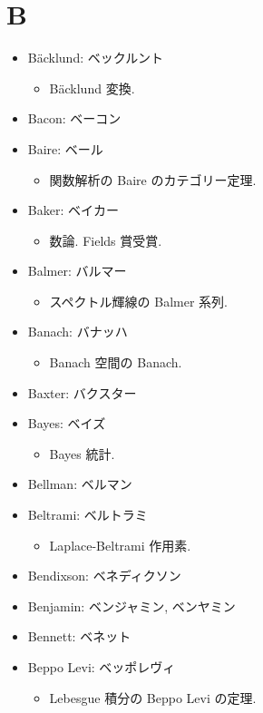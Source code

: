 \documentclass[openany, a4paper, oneside]{jsbook}
\begin{document}
\section{B}

\begin{itemize}
\item B\"acklund: ベックルント
\begin{itemize}
\item B\"acklund 変換.
\end{itemize}
\item Bacon: ベーコン
\item Baire: ベール
\begin{itemize}
\item 関数解析の Baire のカテゴリー定理.
\end{itemize}
\item Baker: ベイカー
\begin{itemize}
\item 数論. Fields 賞受賞.
\end{itemize}
\item Balmer: バルマー
\begin{itemize}
\item スペクトル輝線の Balmer 系列.
\end{itemize}
\item Banach: バナッハ
\begin{itemize}
\item Banach 空間の Banach.
\end{itemize}
\item Baxter: バクスター
\item Bayes: ベイズ
\begin{itemize}
\item Bayes 統計.
\end{itemize}
\item Bellman: ベルマン
\item Beltrami: ベルトラミ
\begin{itemize}
\item Laplace-Beltrami 作用素.
\end{itemize}
\item Bendixson: ベネディクソン
\item Benjamin: ベンジャミン, ベンヤミン
\item Bennett: ベネット
\item Beppo Levi: ベッポレヴィ
\begin{itemize}
\item Lebesgue 積分の Beppo Levi の定理.
\end{itemize}

\end{itemize}
\end{document}
